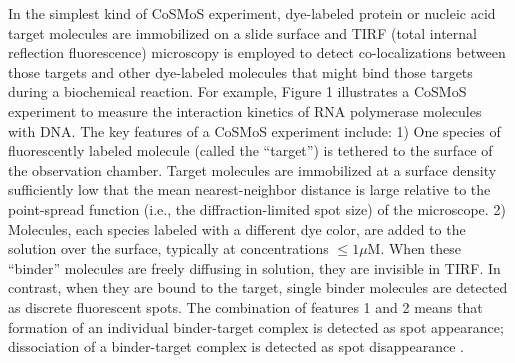 In the simplest kind of CoSMoS experiment, dye-labeled protein or nucleic acid target molecules are immobilized on a slide surface and TIRF (total internal reflection fluorescence) microscopy is employed to detect co-localizations between those targets and other dye-labeled molecules that might bind those targets during a biochemical reaction. For example, Figure 1 illustrates a CoSMoS experiment to measure the interaction kinetics of RNA polymerase molecules with DNA. The key features of a CoSMoS experiment include: 1) One species of fluorescently labeled molecule (called the “target”) is tethered to the surface of the observation chamber. Target molecules are immobilized at a surface density sufficiently low that the mean nearest-neighbor distance is large relative to the point-spread function (i.e., the diffraction-limited spot size) of the microscope. 2) Molecules, each species labeled with a different dye color, are added to the solution over the surface, typically at concentrations $\leq 1 \mu$M. When these “binder” molecules are freely diffusing in solution, they are invisible in TIRF. In contrast, when they are bound to the target, single binder molecules are detected as discrete fluorescent spots. The combination of features 1 and 2 means that formation of an individual binder-target complex is detected as spot appearance; dissociation of a binder-target complex is detected as spot disappearance \cite{Friedman2006-kb, Friedman2015-nx}.

